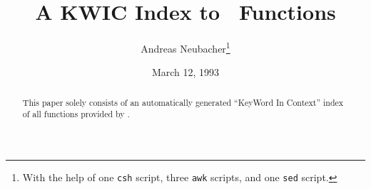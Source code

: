\documentclass{article}
\begin{document}
\title{
  A KWIC Index to \saclib\ Functions
}

\author{
  Andreas Neubacher\thanks{
    With the help of one {\tt csh} script, three {\tt awk} scripts, and one
    {\tt sed} script.
  }
}

\date{March 12, 1993}
\maketitle

\begin{abstract}
This paper solely consists of an automatically generated ``KeyWord In Context''
index of all functions provided by \saclib.
\end{abstract}

\small

\normalsize
\end{document}
